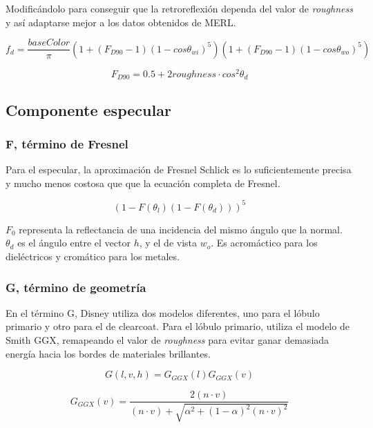     Modific\'andolo para conseguir que la retroreflexi\'on dependa del valor de \textit{roughness} y as\'i
    adaptarse mejor a los datos obtenidos de MERL.

    \begin{equation}
    f_d = \frac{baseColor}{\pi}
    \left(  1 + (F_{D90} - 1)(1 - cos\theta_{wi})^5  \right)
    \left(  1 + (F_{D90} - 1)(1 - cos\theta_{wo})^5  \right)
    \end{equation}
    
    $$
    F_{D90} = 0.5 + 2roughness\cdot{cos^2\theta_d}
    $$

    \subsection{Componente especular}
        \subsubsection{F, t\'ermino de Fresnel}
            Para el especular, la aproximaci\'on de Fresnel Schlick es lo suficientemente precisa y mucho menos costosa que
            que la ecuaci\'on completa de Fresnel.

            \begin{equation}
            (1 - F(\theta_l) (1 - F(\theta_d)))^5
            \end{equation}

            $F_0$ representa la reflectancia de una incidencia del mismo \'angulo que la normal. $\theta_d$ es el \'angulo
            entre el vector $h$, y el de vista $w_o$. Es acrom\'actico para los diel\'ectricos y crom\'atico para los metales.

        \subsubsection{G, t\'ermino de geometr\'ia}
            En el t\'ermino G, Disney utiliza dos modelos diferentes, uno para el l\'obulo primario y otro para el de clearcoat.
            Para el l\'obulo primario, utiliza el modelo de Smith GGX, remapeando el valor de \textit{roughness} para evitar
            ganar demasiada energ\'ia hacia los bordes de materiales brillantes.

            $$
            G(l, v, h) = G_{GGX}(l)G_{GGX}(v)
            $$

            $$
            G_{GGX}(v) = \frac
            {2 (n \cdot{v})}
            {(n \cdot{v}) + \sqrt{ \alpha^2 + (1 - \alpha)^2 (n \cdot{v})^2 }}
            $$

